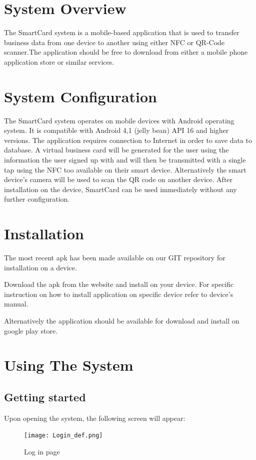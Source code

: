 \documentclass[english]{article}
\begin{document}
	\section{System Overview}
	The SmartCard system is a mobile-based application that is used to transfer business data from one device to another using either NFC or QR-Code scanner.The application should be free to download from either a mobile phone application store or similar services. 
	
	\section{System Configuration}
	The SmartCard system operates on mobile devices with Android operating system. It is compatible with
	Android 4,1 (jelly bean) API 16 and higher versions. The application requires connection to Internet in order to
	save data to database. A virtual business card will be generated for the user using the information the user signed up with and will then be transmitted with a single tap using the NFC too available on their smart device. Alternatively the smart device’s camera will be used to scan the QR code on another device. After
	installation on the device, SmartCard can be used immediately without any further configuration.
	\section{Installation}
	The most recent apk has been made available on our GIT repository for installation on a device. 
	
	Download the apk from the website and install on your device. For specific instruction on how to install application on specific device refer to
	device’s manual.
	
	Alternatively the application should be available for download and install on google play store.
	

	\section {Using The System}
	\subsection{Getting started}
	Upon opening the system, the following screen will appear:
	
			\begin{figure}[H]
				\centering
			\texttt{[image: Login\_def.png]}
				\caption{Log in page}
				\label{figure: 1}
			\end{figure}
\end{document}

